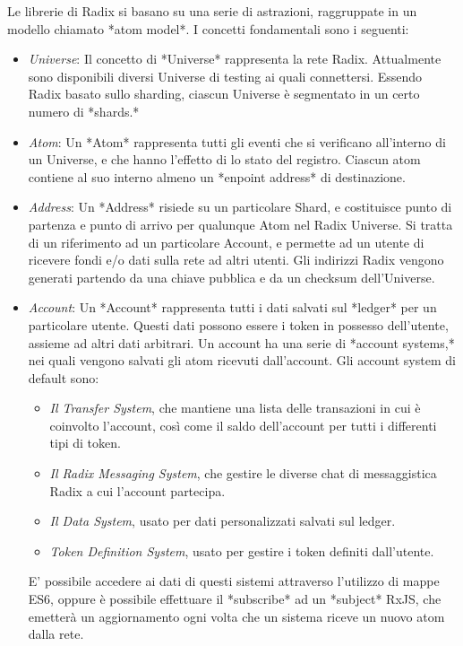 Le librerie di Radix si basano su una serie di astrazioni, raggruppate in un modello chiamato *atom model*. I concetti fondamentali sono i seguenti:
\begin{itemize}
    \item \textit{Universe}: Il concetto di *Universe* rappresenta la rete Radix. Attualmente sono disponibili diversi Universe di testing ai quali connettersi. Essendo Radix basato sullo sharding, ciascun Universe è segmentato in un certo numero di *shards.* 
    \item \textit{Atom}: Un *Atom* rappresenta tutti gli eventi che si verificano all'interno di un Universe, e che hanno l'effetto di lo stato del registro. Ciascun atom contiene al suo interno almeno un *enpoint address* di destinazione.
    \item \textit{Address}: Un *Address* risiede su un particolare Shard, e costituisce punto di partenza e punto di arrivo per qualunque Atom nel Radix Universe. Si tratta di un riferimento ad un particolare Account, e permette ad un utente di ricevere fondi e/o dati sulla rete ad altri utenti. Gli indirizzi Radix vengono generati partendo da una chiave pubblica e da un checksum dell'Universe. 
    \item \textit{Account}: Un *Account* rappresenta tutti i dati salvati sul *ledger* per un particolare utente. Questi dati possono essere i token in possesso dell'utente, assieme ad altri dati arbitrari. Un account ha una serie di *account systems,* nei quali vengono salvati gli atom ricevuti dall'account. Gli account system di default sono:
    \begin{itemize}
        \item \textit{Il Transfer System}, che mantiene una lista delle transazioni in cui è coinvolto l'account, così come il saldo dell'account per tutti i differenti tipi di token.
        \item \textit{Il Radix Messaging System}, che gestire le diverse chat di messaggistica Radix a cui l'account partecipa.
        \item \textit{Il Data System}, usato per dati personalizzati salvati sul ledger.
        \item \textit{Token Definition System}, usato per gestire i token definiti dall'utente.
    \end{itemize}
    E' possibile accedere ai dati di questi sistemi attraverso l'utilizzo di mappe ES6, oppure è possibile effettuare il *subscribe* ad un *subject* RxJS, che emetterà un aggiornamento ogni volta che un sistema riceve un nuovo atom dalla rete.

\end{itemize}
